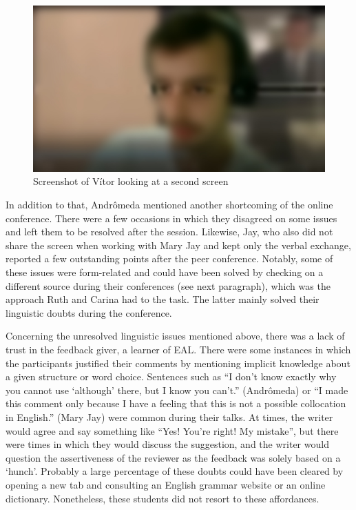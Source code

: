 \documentclass[english]{textolivre}
\begin{document}
\begin{figure}[h!]
\centering
\begin{minipage}{.8\textwidth}
 \includegraphics[width=\textwidth]{Fig4.jpeg}
 \caption{Screenshot of Vítor looking at a second screen}
 \label{fig5}
\end{minipage}
\end{figure}

In addition to that, Andrômeda mentioned another shortcoming of the online conference. There were a few occasions in which they disagreed on some issues and left them to be resolved after the session. Likewise, Jay, who also did not share the screen when working with Mary Jay and kept only the verbal exchange, reported a few outstanding points after the peer conference. Notably, some of these issues were form-related and could have been solved by checking on a different source during their conferences (see next paragraph), which was the approach Ruth and Carina had to the task. The latter mainly solved their linguistic doubts during the conference.

Concerning the unresolved linguistic issues mentioned above, there was a lack of trust in the feedback giver, a learner of EAL. There were some instances in which the participants justified their comments by mentioning implicit knowledge about a given structure or word choice. Sentences such as “I don’t know exactly why you cannot use ‘although’ there, but I know you can’t.” (Andrômeda) or “I made this comment only because I have a feeling that this is not a possible collocation in English.” (Mary Jay) were common during their talks. At times, the writer would agree and say something like “Yes! You’re right! My mistake”, but there were times in which they would discuss the suggestion, and the writer would question the assertiveness of the reviewer as the feedback was solely based on a ‘hunch’. Probably a large percentage of these doubts could have been cleared by opening a new tab and consulting an English grammar website or an online dictionary. Nonetheless, these students did not resort to these affordances.
\end{document}
